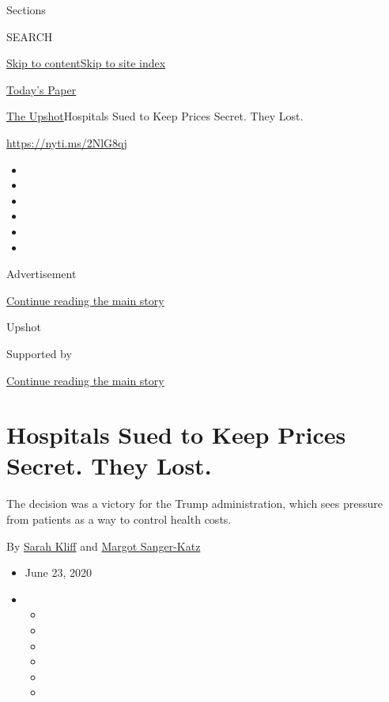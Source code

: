Sections

SEARCH

\protect\hyperlink{site-content}{Skip to
content}\protect\hyperlink{site-index}{Skip to site index}

\href{https://myaccount.nytimes3xbfgragh.onion/auth/login?response_type=cookie\&client_id=vi}{}

\href{https://www.nytimes3xbfgragh.onion/section/todayspaper}{Today's
Paper}

\href{/section/upshot}{The Upshot}\textbar{}Hospitals Sued to Keep
Prices Secret. They Lost.

\url{https://nyti.ms/2NlG8qj}

\begin{itemize}
\item
\item
\item
\item
\item
\item
\end{itemize}

Advertisement

\protect\hyperlink{after-top}{Continue reading the main story}

Upshot

Supported by

\protect\hyperlink{after-sponsor}{Continue reading the main story}

\hypertarget{hospitals-sued-to-keep-prices-secret-they-lost}{%
\section{Hospitals Sued to Keep Prices Secret. They
Lost.}\label{hospitals-sued-to-keep-prices-secret-they-lost}}

The decision was a victory for the Trump administration, which sees
pressure from patients as a way to control health costs.

By \href{https://www.nytimes3xbfgragh.onion/by/sarah-kliff}{Sarah Kliff}
and
\href{https://www.nytimes3xbfgragh.onion/by/margot-sanger-katz}{Margot
Sanger-Katz}

\begin{itemize}
\item
  June 23, 2020
\item
  \begin{itemize}
  \item
  \item
  \item
  \item
  \item
  \item
  \end{itemize}
\end{itemize}

